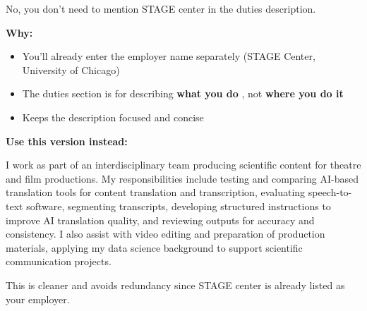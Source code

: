\begin{botresponse}
No, you don't need to mention STAGE center in the duties description.

\textbf{Why:}

\begin{itemize}
\item You'll already enter the employer name separately (STAGE Center, University of Chicago)
\item The duties section is for describing \textbf{what you do} , not \textbf{where you do it}
\item Keeps the description focused and concise
\end{itemize}

\textbf{Use this version instead:}

I work as part of an interdisciplinary team producing scientific content for theatre and film productions. My responsibilities include testing and comparing AI-based translation tools for content translation and transcription, evaluating speech-to-text software, segmenting transcripts, developing structured instructions to improve AI translation quality, and reviewing outputs for accuracy and consistency. I also assist with video editing and preparation of production materials, applying my data science background to support scientific communication projects.

This is cleaner and avoids redundancy since STAGE center is already listed as your employer.
\end{botresponse}